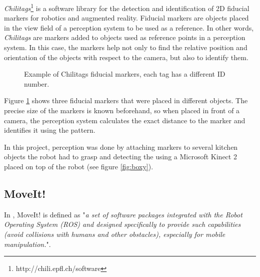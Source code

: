 \textit{Chilitags}\footnote{http://chili.epfl.ch/software} is a software library for the detection and identification of 2D fiducial markers for robotics and augmented reality. Fiducial markers are objects placed in the view field of a perception system to be used as a reference. In other words, \textit{Chilitags} are markers added to objects used as reference points in a perception system. In this case, the markers help not only to find the relative position and orientation of the objects with respect to the camera, but also to identify them.
\begin{figure}[H]
	\centering \vspace{-10pt}
	\begin{subfigure}[][Tag 0]
		{\texttt{[image: 0.png]}}
	\end{subfigure}
	\begin{subfigure}[][Tag 1]
		{\texttt{[image: 1.png]}}
	\end{subfigure}
	\begin{subfigure}[][Tag 2]
		{\texttt{[image: 2.png]}}
	\end{subfigure}
	\vspace{-10pt}
	\caption[Example of Chilitags fiducial markers]{Example of Chilitags fiducial markers, each tag has a different ID number.}
	\vspace{-10pt}
	\label{fig:chilitag}
\end{figure}

Figure \ref{fig:chilitag} shows three fiducial markers that were placed in different objects. The precise size of the markers is known beforehand, so when placed in front of a camera, the perception system calculates the exact distance to the marker and identifies it using the pattern.

In this project, perception was done by attaching markers to several kitchen objects the robot had to grasp and detecting the using a Microsoft Kinect 2 placed on top of the robot (see figure \ref{fig:boxy}).

\subsection{MoveIt!}
\label{subsec:moveit}

In \citet{moveit}, MoveIt! is defined as "\textit{a set of software	packages integrated with the Robot Operating System (ROS) and designed specifically to provide such capabilities (avoid collisions with humans and other obstacles), especially for mobile manipulation.}".

